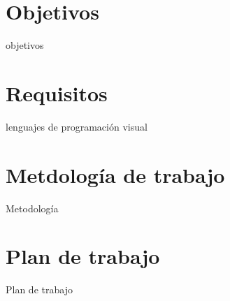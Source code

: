 \section{Objetivos}
\label{sec:objetivos}

objetivos

\section{Requisitos}
\label{sec:requisitos}

lenguajes de programación visual

\section{Metdología de trabajo}
\label{sec:metodologia}

Metodología

\section{Plan de trabajo}
\label{sec:plan}

Plan de trabajo
